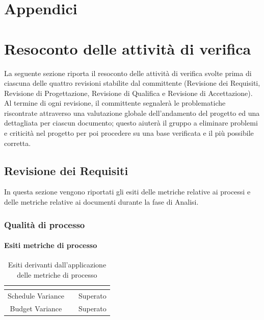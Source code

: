 \appendix
{}
\section*{Appendici}
\section{Resoconto delle attività di verifica}
La seguente sezione riporta il resoconto delle attività di verifica svolte prima di ciascuna delle quattro revisioni stabilite dal committente (Revisione dei Requisiti, Revisione di Progettazione, Revisione di Qualifica e Revisione di Accettazione).
Al termine di ogni revisione, il committente segnalerà le problematiche riscontrate attraverso una valutazione globale dell'andamento del progetto ed una dettagliata per ciascun documento; questo aiuterà il gruppo a eliminare problemi e criticità nel progetto per poi procedere su una base verificata e il più possibile corretta.

\subsection{Revisione dei Requisiti}
In questa sezione vengono riportati gli esiti delle metriche relative ai processi e delle metriche relative ai documenti durante la fase di Analisi.
\subsubsection{Qualità di processo}
 
\paragraph{Esiti metriche di processo} \Spazio
\renewcommand{\arraystretch}{1.5}
\begin{table}[H]
	\begin{center}
		\begin{tabular}{|c|c|c|}
			\hline
			\rowcolor{title_row}
			\textbf{\color{title_text}{Metrica}} & \textbf{\color{title_text}{Valore ottenuto}} & \textbf{\color{title_text}{Esito}} \\
			\hline
			{Schedule Variance} & {} & {Superato}\\	
			\hline
			{Budget Variance} & {} & {Superato}\\	
			\hline
		\end{tabular}
	\caption[Esiti metriche di processo, Analisi]{Esiti derivanti dall'applicazione delle metriche di processo}	
	\label{tabella: esiti derivanti dall'applicazione delle metriche di processo}
	\end{center}
\end{table}

